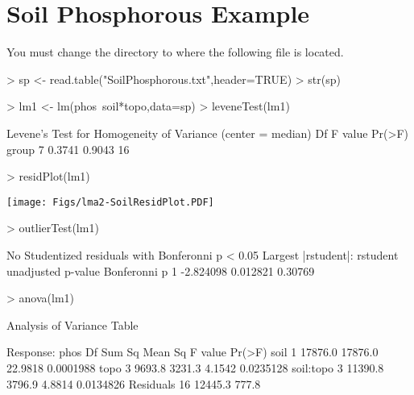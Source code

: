 \documentclass{article}
\begin{document}
\section{Soil Phosphorous Example}
You must change the directory to where the following file is located.
\begin{Schunk}
\begin{Sinput}
> sp <- read.table("SoilPhosphorous.txt",header=TRUE)
> str(sp)
\end{Sinput}
\begin{Sinput}
> lm1 <- lm(phos~soil*topo,data=sp)
> leveneTest(lm1)
\end{Sinput}
\begin{Soutput}
Levene's Test for Homogeneity of Variance (center = median)
      Df F value Pr(>F)
group  7  0.3741 0.9043
      16               
\end{Soutput}
\end{Schunk}
\begin{Schunk}
\begin{Sinput}
> residPlot(lm1)
\end{Sinput}
\end{Schunk}
\texttt{[image: Figs/lma2-SoilResidPlot.PDF]}

\begin{Schunk}
\begin{Sinput}
> outlierTest(lm1)
\end{Sinput}
\begin{Soutput}
No Studentized residuals with Bonferonni p < 0.05
Largest |rstudent|:
   rstudent unadjusted p-value Bonferonni p
1 -2.824098           0.012821      0.30769
\end{Soutput}
\begin{Sinput}
> anova(lm1)
\end{Sinput}
\begin{Soutput}
Analysis of Variance Table

Response: phos
          Df  Sum Sq Mean Sq F value    Pr(>F)
soil       1 17876.0 17876.0 22.9818 0.0001988
topo       3  9693.8  3231.3  4.1542 0.0235128
soil:topo  3 11390.8  3796.9  4.8814 0.0134826
Residuals 16 12445.3   777.8                  
\end{Soutput}
\end{Schunk}
\end{document}
